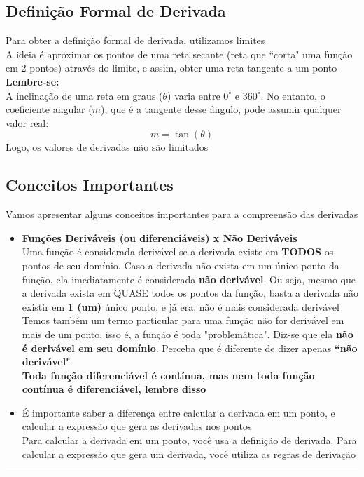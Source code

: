 \documentclass{article}
\begin{document}
\subsection{Definição Formal de Derivada}
Para obter a definição formal de derivada, utilizamos limites
\\[10pt]
A ideia é aproximar os pontos de uma reta secante (reta que ``corta" uma função em 2 pontos) através do limite, e assim, obter uma reta tangente a um ponto
\\[10pt]
\textbf{Lembre-se:}
\\[10pt]
A inclinação de uma reta em graus (\(\theta\)) varia entre \(0^\circ\) e \(360^\circ\). No entanto, o coeficiente angular (\(m\)), que é a tangente desse ângulo, pode assumir qualquer valor real:
\[
m = \tan(\theta)
\]
Logo, os valores de derivadas não são limitados

\subsection{Conceitos Importantes}
Vamos apresentar alguns conceitos importantes para a compreensão das derivadas
\begin{itemize}
    \item \textbf{Funções Deriváveis (ou diferenciáveis) x Não Deriváveis}\\[10pt]
    Uma função é considerada derivável se a derivada existe em \textbf{TODOS} os pontos de seu domínio. Caso a derivada não exista em um único ponto da função, ela imediatamente é considerada \textbf{não derivável}. Ou seja, mesmo que a derivada exista em QUASE todos os pontos da função, basta a derivada não existir em \textbf{1 (um)} único ponto, e já era, não é mais considerada derivável\\[10pt]
    Temos também um termo particular para uma função não for derivável em mais de um ponto, isso é, a função é toda "problemática". Diz-se que ela \textbf{não é derivável em seu domínio}. Perceba que é diferente de dizer apenas \textbf{``não derivável"}
    \\[5pt]
    \textbf{Toda função diferenciável é contínua, mas nem toda função contínua é diferenciável, lembre disso}

    \item É importante saber a diferença entre calcular a derivada em um ponto, e calcular a expressão que gera as derivadas nos pontos\\[10pt] Para calcular a derivada em um ponto, você usa a definição de derivada. Para calcular a expressão que gera um derivada, você utiliza as regras de derivação
\end{itemize}
\vspace{15pt}
\hrule
\end{document}
